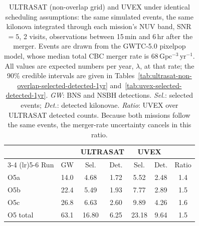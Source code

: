 \begin{table}[!htb]
\centering
\renewcommand\arraystretch{1.15}
\setlength{\tabcolsep}{0.14cm}
\caption{ULTRASAT (non-overlap grid) and UVEX under identical scheduling
assumptions: the same simulated events, the same kilonova integrated through
each mission's NUV band, SNR\,$=5$, 2 visits, observations between
15\,min and 6\,hr after the merger. Events are
drawn from the GWTC-5.0 pixelpop model, whose median total CBC merger rate is
68\,$\mathrm{Gpc^{-3}\,yr^{-1}}$. All values are expected numbers
per year, $\lambda$, at that rate; the 90\% credible intervals are given in
Tables~\ref{tab:ultrasat-non-overlap-selected-detected-1yr}
and~\ref{tab:uvex-selected-detected-1yr}. \emph{GW}: BNS and NSBH detections.
\emph{Sel.}: selected events; \emph{Det.}: detected kilonovae.
\emph{Ratio}: UVEX over ULTRASAT detected counts. Because both missions follow
the same events, the merger-rate uncertainty cancels in this ratio.}
\label{tab:mission-comparison}
\begin{tabular}{lcccccc}
\toprule
 & & \multicolumn{2}{c}{ULTRASAT} & \multicolumn{2}{c}{UVEX} & \\
\cmidrule(lr){3-4} \cmidrule(lr){5-6}
Run & GW & Sel. & Det. & Sel. & Det. & Ratio \\
\midrule
O5a & 14.0 & 4.68 & 1.72 & 5.52 & 2.48 & 1.4 \\
O5b & 22.4 & 5.49 & 1.93 & 7.77 & 2.89 & 1.5 \\
O5c & 26.8 & 6.63 & 2.60 & 9.89 & 4.26 & 1.6 \\
\midrule
O5 total & 63.1 & 16.80 & 6.25 & 23.18 & 9.64 & 1.5 \\
\bottomrule
\end{tabular}
\end{table}
